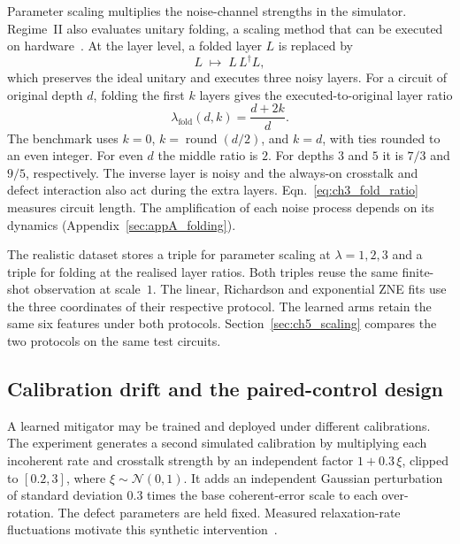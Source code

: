 \documentclass[Thesis.tex]{subfiles}
\begin{document}
Parameter scaling multiplies the noise-channel strengths in the simulator.
Regime~II also evaluates unitary folding, a scaling method that can be
executed on hardware~\cite{giurgicatiron2020digital,larose2022mitiq}.
At the layer level, a folded layer $L$ is replaced by
\begin{equation}
    L \;\longmapsto\; L \, L^{\dagger} L,
    \label{eq:ch3_fold}
\end{equation}
which preserves the ideal unitary and executes three noisy layers. For a
circuit of original depth $d$, folding the first $k$ layers gives the
executed-to-original layer ratio
\begin{equation}
    \lambda_{\text{fold}}(d,k) = \frac{d + 2k}{d}.
    \label{eq:ch3_fold_ratio}
\end{equation}
The benchmark uses $k=0$, $k=\operatorname{round}(d/2)$, and $k=d$,
with ties rounded to an even integer. For even $d$ the middle ratio is $2$.
For depths $3$ and $5$ it is $7/3$ and $9/5$, respectively. The
inverse layer is noisy and the always-on crosstalk and defect interaction
also act during the extra layers. Eqn.~\eqref{eq:ch3_fold_ratio}
measures circuit length. The amplification of each noise process depends
on its dynamics (Appendix~\ref{sec:appA_folding}).

The realistic dataset stores a triple for parameter scaling at
$\lambda=1,2,3$ and a triple for folding at the realised layer ratios.
Both triples reuse the same finite-shot observation at scale~$1$.
The linear, Richardson and exponential ZNE fits use the three coordinates
of their respective protocol. The learned arms retain the same six
features under both protocols. Section~\ref{sec:ch5_scaling} compares the
two protocols on the same test circuits.

\subsection{Calibration drift and the paired-control design}\label{sec:ch3_drift}

A learned mitigator may be trained and deployed under different calibrations.
The experiment generates a second simulated calibration by multiplying each
incoherent rate and crosstalk strength by an independent factor
$1 + 0.3\,\xi$, clipped to $[0.2, 3]$, where $\xi \sim \mathcal{N}(0,1)$.
It adds an independent Gaussian perturbation of standard deviation $0.3$ times
the base coherent-error scale to each over-rotation. The defect parameters
are held fixed. Measured relaxation-rate fluctuations motivate this synthetic
intervention~\cite{klimov2018fluctuations}.
\end{document}
